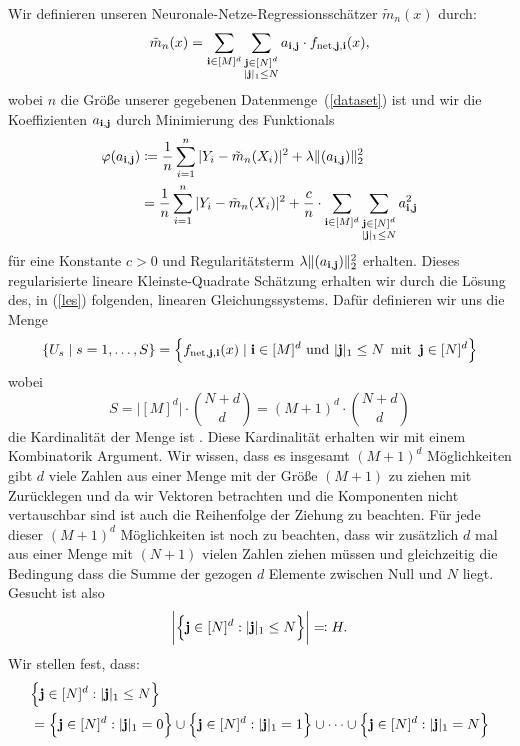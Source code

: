 Wir definieren unseren Neuronale-Netze-Regressionsschätzer $\tilde{m}_n(x)$  durch:
\begin{equation}
\label{estimate}
\tilde{m}_n(x) = \sum_{\mathbf{i} \in [M]^d} \sum_{\substack{\mathbf{j} \in [N]^d\\|\mathbf{j}|_1 \leq N}} a_{\mathbf{i},\mathbf{j}} \cdot f_{\mathrm{net},\mathbf{j},\mathbf{i}}(x),
\end{equation}
wobei $n$ die Größe unserer gegebenen Datenmenge~(\ref{dataset}) ist und wir die Koeffizienten $a_{\mathbf{i},\mathbf{j}}$ durch Minimierung des Funktionals 
\begin{equation}
\label{min} 
\begin{split}
\varphi(a_{\mathbf{i},\mathbf{j}}) & \coloneqq \frac{1}{n} \sum_{i = 1}^n|Y_i - \tilde{m}_n(X_i)|^2 + \lambda\|(a_{\mathbf{i},\mathbf{j}})\|_2^2 \\
& =\frac{1}{n} \sum_{i = 1}^n|Y_i - \tilde{m}_n(X_i)|^2 + \frac{c}{n} \cdot \sum_{\mathbf{i} \in [M]^d} \sum_{\substack{\mathbf{j} \in [N]^d\\|\mathbf{j}|_1 \leq N}} a_{\mathbf{i},\mathbf{j}}^2
\end{split}
\end{equation}
für eine Konstante $c > 0$ und Regularitätsterm $\lambda\|(a_{\mathbf{i},\mathbf{j}})\|_2^2$ erhalten. Dieses regularisierte lineare Kleinste-Quadrate Schätzung erhalten wir durch die Lösung des, in (\ref{les}) folgenden, linearen Gleichungssystems. Dafür definieren wir uns die Menge 
\begin{align*} 
\{U_s \mid s = 1,\dots,S\} = \Bigl\{f_{\mathrm{net},\mathbf{j},\mathbf{i}}(x) \mid \mathbf{i} \in [M]^d \text{ und } |\mathbf{j}|_1 \leq N \, \text{ mit }\, \mathbf{j} \in [N]^d \Bigr\}
\end{align*}
wobei
$$ S = \big|[M]^d\big| \cdot  \binom{N + d}{d} = (M + 1)^d \cdot \binom{N + d}{d}$$ die Kardinalität der Menge ist .
Diese Kardinalität erhalten wir mit einem Kombinatorik Argument.
Wir wissen, dass es insgesamt $(M + 1)^d$ Möglichkeiten gibt $d$ viele Zahlen aus einer Menge mit der Größe $(M + 1)$ zu ziehen mit Zurücklegen und da wir Vektoren betrachten und die Komponenten nicht vertauschbar sind ist auch die Reihenfolge der Ziehung zu beachten.
Für jede dieser $(M + 1)^d$ Möglichkeiten ist noch zu beachten, dass wir zusätzlich $d$ mal aus einer Menge mit $(N + 1)$ vielen Zahlen ziehen müssen und gleichzeitig die Bedingung dass die Summe der gezogen $d$ Elemente zwischen Null und $N$ liegt.
Gesucht ist also 
$$\bigg|\Bigl\{\mathbf{j} \in [N]^d : |\mathbf{j}|_1 \leq N \Bigr\}\bigg| \eqqcolon H.$$ 
Wir stellen fest, dass:
\begin{equation*}
\begin{split}
& \Bigl\{\mathbf{j} \in [N]^d : |\mathbf{j}|_1 \leq N \Bigr\} \\
& = \Bigl\{\mathbf{j} \in [N]^d : |\mathbf{j}|_1 = 0 \Bigr\}
 \cup \Bigl\{\mathbf{j} \in [N]^d : |\mathbf{j}|_1 = 1 \Bigr\}
 \cup \dots 
 \cup \Bigl\{\mathbf{j} \in [N]^d : |\mathbf{j}|_1 = N\Bigr\}
\end{split}
\end{equation*}
